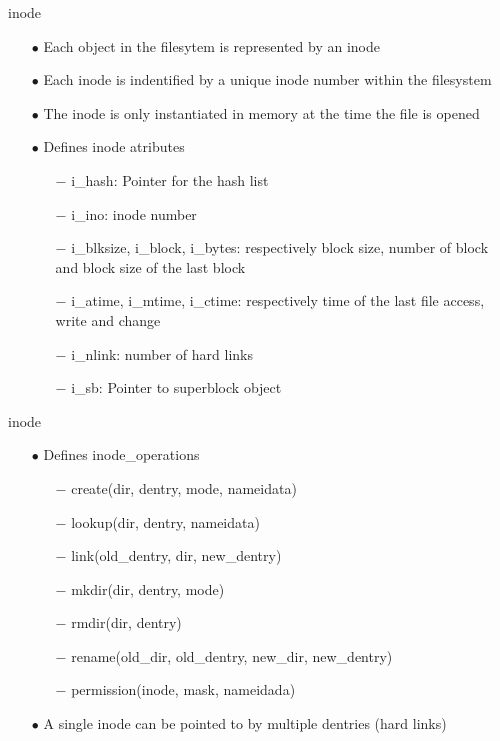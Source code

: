 \documentclass{beamer}
\begin{document}
\begin{frame}{inode}
	
	\begin{itemize}[<+->]

		\item[$\bullet$]{Each object in the filesytem is represented by an inode}
		\item[$\bullet$]{Each inode is indentified by a unique inode number within the filesystem}		
		\item[$\bullet$]{The inode is only instantiated in memory at the time the file is opened}
		
		\item[$\bullet$]{Defines inode atributes}
			\begin{itemize}
				\item[$-$]{i\_hash: Pointer for the hash list}
				\item[$-$]{i\_ino: inode number}
				\item[$-$]{i\_blksize, i\_block, i\_bytes: respectively block size, number of block and block size of the last block}
				\item[$-$]{i\_atime, i\_mtime, i\_ctime: respectively time of the last file access, write and change}
				\item[$-$]{i\_nlink: number of hard links}
				\item[$-$]{i\_sb: Pointer to superblock object}
			\end{itemize}
	\end{itemize}

\end{frame}

\begin{frame}{inode}
	\begin{itemize}[<+->]
		\item[$\bullet$]{Defines inode\_operations}
			\begin{itemize}
				\item[$-$]{create(dir, dentry, mode, nameidata)}
				\item[$-$]{lookup(dir, dentry, nameidata)}
				\item[$-$]{link(old\_dentry, dir, new\_dentry)}
				\item[$-$]{mkdir(dir, dentry, mode)}
				\item[$-$]{rmdir(dir, dentry)}
				\item[$-$]{rename(old\_dir, old\_dentry, new\_dir, new\_dentry)}	
				\item[$-$]{permission(inode, mask, nameidada)}
			\end{itemize}

		\item[$\bullet$]{A single inode can be pointed to by multiple dentries (hard links)}
	\end{itemize}
\end{frame}
\end{document}
